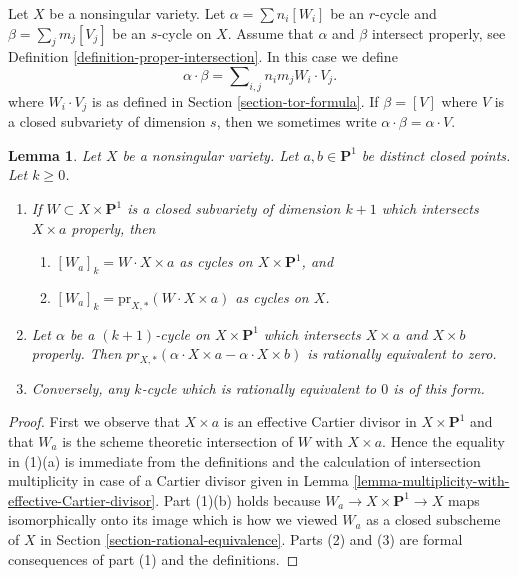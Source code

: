 \documentclass{stacks-project}
\theoremstyle{plain}
\newtheorem{lemma}[subsection]{Lemma}
\theoremstyle{definition}
\theoremstyle{remark}
\numberwithin{equation}{subsection}
\begin{document}
\noindent
Let $X$ be a nonsingular variety. Let
$\alpha = \sum n_i [W_i]$ be an $r$-cycle and
$\beta = \sum_j m_j [V_j]$ be an $s$-cycle on $X$.
Assume that $\alpha$ and $\beta$ intersect properly, see
Definition \ref{definition-proper-intersection}.
In this case we define
$$
\alpha \cdot \beta = \sum\nolimits_{i,j} n_i m_j W_i \cdot V_j.
$$
where $W_i \cdot V_j$ is as defined in Section \ref{section-tor-formula}.
If $\beta = [V]$ where $V$ is a closed subvariety of dimension $s$,
then we sometimes write $\alpha \cdot \beta = \alpha \cdot V$.

\begin{lemma}
\label{lemma-rational-equivalence-and-intersection}
Let $X$ be a nonsingular variety. Let $a, b \in \mathbf{P}^1$
be distinct closed points. Let $k \geq 0$.
\begin{enumerate}
\item If $W \subset X \times \mathbf{P}^1$ is a closed subvariety
of dimension $k + 1$ which intersects $X \times a$ properly, then
\begin{enumerate}
\item $[W_a]_k = W \cdot X \times a$ as cycles on $X \times \mathbf{P}^1$, and
\item $[W_a]_k = \text{pr}_{X, *}(W \cdot X \times a)$ as cycles on $X$.
\end{enumerate}
\item Let $\alpha$ be a $(k + 1)$-cycle on $X \times \mathbf{P}^1$
which intersects $X \times a$ and $X \times b$ properly. Then
$pr_{X,*}( \alpha \cdot X \times a - \alpha \cdot X \times b)$
is rationally equivalent to zero.
\item Conversely, any $k$-cycle which is
rationally equivalent to $0$ is of this form.
\end{enumerate}
\end{lemma}

\begin{proof}
First we observe that $X \times a$ is an effective Cartier divisor in
$X \times \mathbf{P}^1$ and that $W_a$ is the scheme theoretic intersection
of $W$ with $X \times a$. Hence the equality in (1)(a) is
immediate from the definitions and the calculation of intersection
multiplicity in case of a Cartier divisor given in
Lemma \ref{lemma-multiplicity-with-effective-Cartier-divisor}.
Part (1)(b) holds because $W_a \to X \times \mathbf{P}^1 \to X$ maps
isomorphically onto its image which is how we viewed $W_a$
as a closed subscheme of $X$ in Section \ref{section-rational-equivalence}.
Parts (2) and (3) are formal consequences of part (1) and the definitions.
\end{proof}
\end{document}
